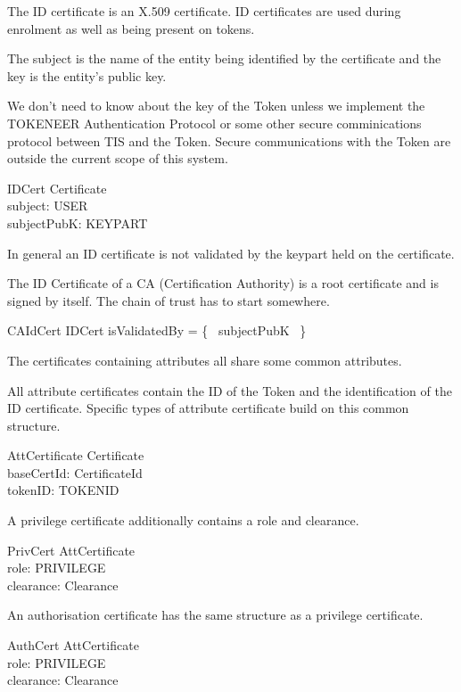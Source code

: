 The ID certificate is an X.509 certificate. ID certificates are used
during enrolment as well as being present on tokens.

The subject is the name of the entity being identified by the
certificate and the key is the entity's public key. 

We don't need to know about the key of the Token unless we implement 
the TOKENEER Authentication Protocol or some other secure
comminications protocol between TIS and the Token. Secure
communications with the Token are outside the current scope of this system.

\begin{schema}{IDCert}
	Certificate
\\      subject: USER
\\      subjectPubK: KEYPART
\end{schema}

In general an ID certificate is not validated by the keypart held on
the certificate. 

The ID Certificate of a CA (Certification Authority) is a root
certificate and is signed by itself. The chain of trust has
to start somewhere.

\begin{schema}{CAIdCert}
        IDCert
\where
        isValidatedBy = \{~ subjectPubK ~\} 
\end{schema}


The certificates containing attributes all share some common
attributes. 

All attribute certificates contain the ID of 
the Token and the identification of the ID certificate. Specific types
of attribute certificate build on this common structure.
\begin{schema}{AttCertificate}
        Certificate
\\      baseCertId: CertificateId      
\\      tokenID: TOKENID 
\end{schema}


A privilege certificate additionally contains a role and clearance.
\begin{schema}{PrivCert}
	AttCertificate
\\	role: PRIVILEGE
\\	clearance: Clearance
\end{schema}


An authorisation certificate has the same structure as a privilege certificate.
\begin{schema}{AuthCert}
	AttCertificate
\\	role: PRIVILEGE
\\	clearance: Clearance
\end{schema}

